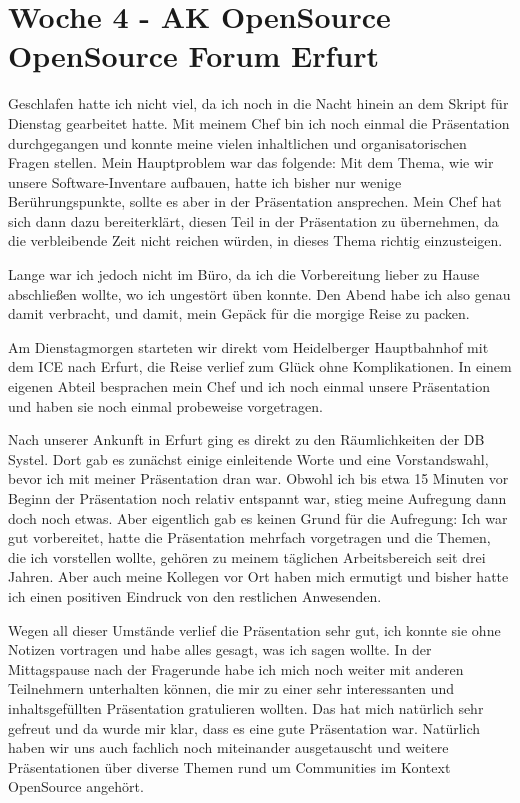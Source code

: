 \section{Woche 4 - AK OpenSource \headerand OpenSource Forum Erfurt} \label{sec:bericht-wo-4}



Geschlafen hatte ich nicht viel, da ich noch in die Nacht hinein an dem Skript für Dienstag gearbeitet hatte.
Mit meinem Chef bin ich noch einmal die Präsentation durchgegangen und konnte meine vielen inhaltlichen und organisatorischen Fragen stellen.
Mein Hauptproblem war das folgende: Mit dem Thema, wie wir unsere Software-Inventare aufbauen, hatte ich bisher nur wenige Berührungspunkte, sollte es aber in der Präsentation ansprechen.
Mein Chef hat sich dann dazu bereiterklärt, diesen Teil in der Präsentation zu übernehmen, da die verbleibende Zeit nicht reichen würden, in dieses Thema richtig einzusteigen.

Lange war ich jedoch nicht im Büro, da ich die Vorbereitung lieber zu Hause abschließen wollte, wo ich ungestört üben konnte.
Den Abend habe ich also genau damit verbracht, und damit, mein Gepäck für die morgige Reise zu packen.


Am Dienstagmorgen starteten wir direkt vom Heidelberger Hauptbahnhof mit dem ICE nach Erfurt, die Reise verlief zum Glück ohne Komplikationen.
In einem eigenen Abteil besprachen mein Chef und ich noch einmal unsere Präsentation und haben sie noch einmal probeweise vorgetragen.

Nach unserer Ankunft in Erfurt ging es direkt zu den Räumlichkeiten der DB Systel.
Dort gab es zunächst einige einleitende Worte und eine Vorstandswahl, bevor ich mit meiner Präsentation dran war.
Obwohl ich bis etwa 15 Minuten vor Beginn der Präsentation noch relativ entspannt war, stieg meine Aufregung dann doch noch etwas.
Aber eigentlich gab es keinen Grund für die Aufregung:
Ich war gut vorbereitet, hatte die Präsentation mehrfach vorgetragen und die Themen, die ich vorstellen wollte, gehören zu meinem täglichen Arbeitsbereich seit drei Jahren.
Aber auch meine Kollegen vor Ort haben mich ermutigt und bisher hatte ich einen positiven Eindruck von den restlichen Anwesenden.

Wegen all dieser Umstände verlief die Präsentation sehr gut, ich konnte sie ohne Notizen vortragen und habe alles gesagt, was ich sagen wollte.
In der Mittagspause nach der Fragerunde habe ich mich noch weiter mit anderen Teilnehmern unterhalten können, die mir zu einer sehr interessanten und inhaltsgefüllten Präsentation gratulieren wollten.
Das hat mich natürlich sehr gefreut und da wurde mir klar, dass es eine gute Präsentation war.
Natürlich haben wir uns auch fachlich noch miteinander ausgetauscht und weitere Präsentationen über diverse Themen rund um Communities im Kontext OpenSource angehört.


